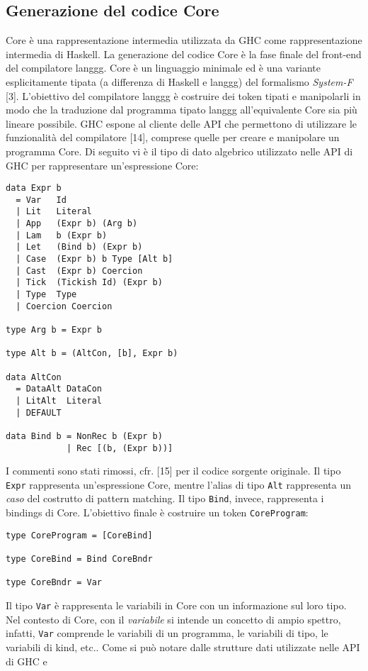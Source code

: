 \documentclass[10pt,a4paper]{article}
\begin{document}
\subsection{Generazione del codice Core}
Core è una rappresentazione intermedia utilizzata da GHC come rappresentazione intermedia di Haskell. La generazione
del codice Core è la fase finale del front-end del compilatore langgg. Core è un linguaggio minimale ed è una variante
esplicitamente tipata (a differenza di Haskell e langgg) del formalismo \textit{System-F} [3]. L'obiettivo del compilatore
langgg è costruire dei token tipati e manipolarli in modo che la traduzione dal programma tipato langgg all'equivalente
Core sia più lineare possibile. GHC espone al cliente delle API che permettono di utilizzare le funzionalità del
compilatore [14], comprese quelle per creare e manipolare un programma Core. Di seguito vi è il tipo di dato algebrico
utilizzato nelle API di GHC per rappresentare un'espressione Core:
\begin{lstlisting}
data Expr b
  = Var   Id
  | Lit   Literal
  | App   (Expr b) (Arg b)
  | Lam   b (Expr b)
  | Let   (Bind b) (Expr b)
  | Case  (Expr b) b Type [Alt b]
  | Cast  (Expr b) Coercion
  | Tick  (Tickish Id) (Expr b)
  | Type  Type
  | Coercion Coercion

type Arg b = Expr b

type Alt b = (AltCon, [b], Expr b)

data AltCon
  = DataAlt DataCon
  | LitAlt  Literal
  | DEFAULT

data Bind b = NonRec b (Expr b)
            | Rec [(b, (Expr b))]
\end{lstlisting}
I commenti sono stati rimossi, cfr. [15] per il codice sorgente originale. Il tipo \texttt{Expr} rappresenta
un'espressione Core, mentre l'alias di tipo \texttt{Alt} rappresenta un \textit{caso} del costrutto di pattern matching.
Il tipo \texttt{Bind}, invece, rappresenta i bindings di Core.
L'obiettivo finale è costruire un token \texttt{CoreProgram}:
\begin{lstlisting}
type CoreProgram = [CoreBind]

type CoreBind = Bind CoreBndr

type CoreBndr = Var
\end{lstlisting}
Il tipo \texttt{Var} è rappresenta le variabili in Core con un informazione sul loro tipo. Nel contesto di Core, con il
\textit{variabile} si intende un concetto di ampio spettro, infatti, \texttt{Var} comprende le variabili di un programma,
le variabili di tipo, le variabili di kind, etc.. Come si può notare dalle strutture dati utilizzate nelle API di GHC e
\end{document}
